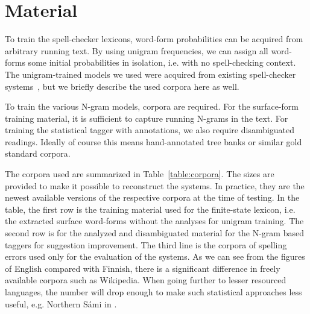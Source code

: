 \documentclass{llncs}
\begin{document}
\section{Material}
\label{sec:material}

To train the spell-checker lexicons, word-form probabilities can be acquired
from arbitrary running text. By using unigram frequencies, we can assign
all word-forms some initial probabilities in isolation, i.e. with no spell-checking context.
The unigram-trained models we used were acquired from existing 
spell-checker systems~\cite{norvig/2010,pirinen/2010/lrec}, but we briefly
describe the used corpora here as well.

To train the various N-gram models, corpora are required. For the surface-form
training material, it is sufficient to capture running N-grams in the text.
For training the statistical tagger with annotations, we also require 
disambiguated readings. Ideally of course this means hand-annotated
tree banks or similar gold standard corpora. 


The corpora used are summarized in Table~\ref{table:corpora}. The sizes are
provided to make it possible to reconstruct the systems. In practice, they are the newest
available versions of the respective corpora at the time of testing. In the
table, the first row is the training material used for the finite-state
lexicon, i.e. the extracted surface word-forms without the analyses for unigram
training. The second row is for the analyzed and disambiguated material for the
N-gram based taggers for suggestion improvement. The third line is the corpora
of spelling errors used only for the evaluation of the systems.  As we can see
from the figures of English compared with Finnish, there is a significant
difference in freely available corpora such as Wikipedia. When going further to
lesser resourced languages, the number will drop enough to make such statistical
approaches less useful, e.g. Northern S\'{a}mi in \cite{pirinen/2010/lrec}.
\end{document}
